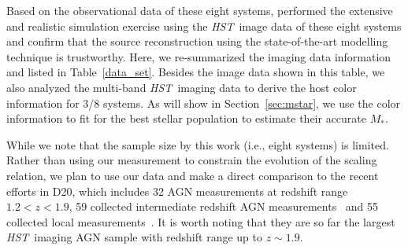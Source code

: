 \documentclass[fleqn,usenatbib]{mnras}
\newcommand{\hst}{{\it HST}}
\newcommand{\mstar}{{$M_*$}}
\begin{document}
Based on the observational data of these eight systems, \citet{Ding2017a} performed the extensive and realistic simulation exercise using the \hst\ image data of these eight systems and confirm that the source reconstruction using the state-of-the-art modelling technique is trustworthy. %
Here, we re-summarized the imaging data information and listed in Table~\ref{data_set}. Besides the image data shown in this table, we also analyzed the multi-band \hst\ imaging data to derive the host color information for 3/8 systems. As will show in Section~\ref{sec:mstar}, we use the color information to fit for the best stellar population to estimate their accurate \mstar. 

While we note that the sample size by this work (i.e., eight systems) is limited. Rather than using our measurement to constrain the evolution of the scaling relation, we plan to use our data and make a direct comparison to the recent efforts in D20, which includes 32 AGN measurements at redshift range $1.2<z<1.9$, 59 collected intermediate redshift AGN measurements~\citep{Bennert11, SS13, Cisternas2011} and 55 collected local measurements~\citep{Bennert++2011, H+R04}. It is worth noting that they are so far the largest \hst\ imaging AGN sample with redshift range up to $z\sim1.9$. 
 
\end{document}
